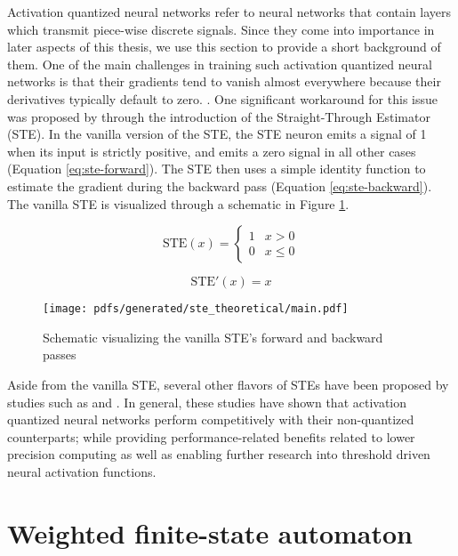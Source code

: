 Activation quantized neural networks refer to neural networks that contain layers which transmit piece-wise discrete signals. Since they come into importance in later aspects of this thesis, we use this section to provide a short background of them. One of the main challenges in training such activation quantized neural networks is that their gradients tend to vanish almost everywhere because their derivatives typically default to zero. \citep{bengio2013estimating,courbariaux2016binarized,yin2019understanding}. One significant workaround for this issue was proposed by \citet{bengio2013estimating} through the introduction of the Straight-Through Estimator (STE). In the vanilla version of the STE, the STE neuron emits a signal of 1 when its input is strictly positive, and emits a zero signal in all other cases (Equation \ref{eq:ste-forward}). The STE then uses a simple identity function to estimate the gradient during the backward pass (Equation \ref{eq:ste-backward}). The vanilla STE is visualized through a schematic in Figure \ref{fig:straight-through-estimator}.

\begin{equation}
  \label{eq:ste-forward}
  \text{STE}(x)=
  \begin{cases}
    1 & x > 0 \\
    0 & x \leq 0
  \end{cases}
\end{equation}

\begin{equation}
  \label{eq:ste-backward}
  \text{STE}'(x)= x
\end{equation}

\begin{figure}[t]
  \centering
  \texttt{[image: pdfs/generated/ste\_theoretical/main.pdf]}
  \caption{Schematic visualizing the vanilla STE's forward and backward passes}
  \label{fig:straight-through-estimator}
\end{figure}

Aside from the vanilla STE, several other flavors of STEs have been proposed by studies such as \citet{courbariaux2016binarized} and \citet{yin2019understanding}. In general, these studies have shown that activation quantized neural networks perform competitively with their non-quantized counterparts; while providing performance-related benefits related to lower precision computing as well as enabling further research into threshold driven neural activation functions.

\section{Weighted finite-state automaton}

